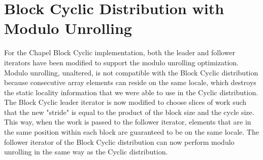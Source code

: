 \section{Block Cyclic Distribution with Modulo Unrolling}\label{sec:block_cyclic_modulo}

For the Chapel Block Cyclic implementation, both the leader and follower iterators have been modified to support the modulo unrolling optimization. Modulo unrolling, unaltered, is not compatible with the Block Cyclic distribution because consecutive array elements can reside on the same locale, which destroys the static locality information that we were able to use in the Cyclic distribution. The Block Cyclic leader iterator is now modified to choose slices of work such that the new "stride" is equal to the product of the block size and the cycle size. This way, when the work is passed to the follower iterator, elements that are in the same position within each block are guaranteed to be on the same locale. The follower iterator of the Block Cyclic distribution can now perform modulo unrolling in the same way as the Cyclic distribution. 

